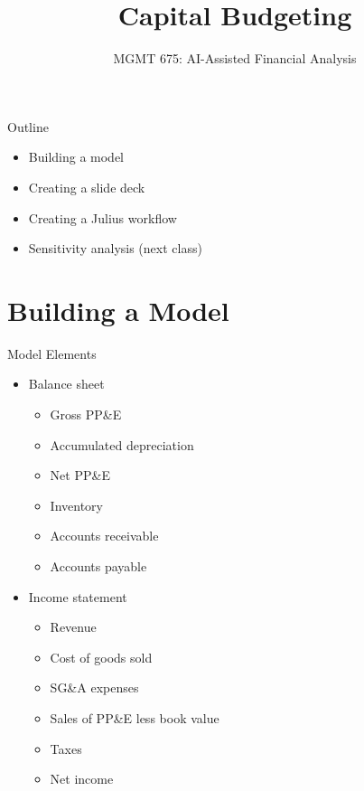 \documentclass[10pt]{beamer}
\title{Capital Budgeting}
\subtitle{MGMT 675: AI-Assisted Financial Analysis}
\date{}
\begin{document}
\begin{frame}[plain]
\titlepage
\end{frame}

\begin{frame}{Outline}
\begin{itemize}
\item Building a model
\item Creating a slide deck
\item Creating a Julius workflow
\item Sensitivity analysis (next class)
\end{itemize}
\end{frame}

\section{Building a Model}

\begin{frame}{Model Elements}

    \begin{itemize}
        \item Balance sheet
    \begin{itemize}
        \item Gross PP\&E
        \item Accumulated depreciation
        \item Net PP\&E
        \item Inventory
        \item Accounts receivable
        \item Accounts payable
    \end{itemize}
    \item Income statement
    \begin{itemize}
        \item Revenue
        \item Cost of goods sold
        \item SG\&A expenses
        \item Sales of PP\&E less book value
        \item Taxes
        \item Net income
    \end{itemize}
    \end{itemize}
\end{frame}
\end{document}
